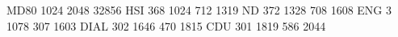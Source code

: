 MD80 1024 2048 32856
HSI  368 1024 712 1319
ND   372 1328 708 1608
ENG    3 1078 307 1603
DIAL 302 1646 470 1815
CDU  301 1819 586 2044
